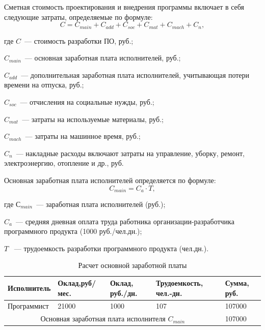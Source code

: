 Сметная стоимость проектирования и внедрения программы включает в себя следующие затраты, определяемые по формуле:
\begin{equation}
  C = C_{main} + C_{add} + C_{soc} + C_{mat} + C_{mach} + C_{n},
\end{equation}
\begin{ESKDexplanation}
  \item[где ] $C$~--- стоимость разработки ПО, руб.;
  \item $C_{main}$~--- основная заработная плата исполнителей, руб.;
  \item $C_{add}$~--- дополнительная заработная плата исполнителей, учитывающая потери времени на отпуска, руб.;
  \item $C_{soc}$~--- отчисления на социальные нужды, руб.;
  \item $C_{mat}$~--- затраты на используемые материалы, руб.;
  \item $C_{mach}$~--- затраты на  машинное время, руб.;
  \item $C_{n}$~--- накладные расходы включают затраты на управление, уборку, ремонт, электроэнергию, отопление и др., руб.
\end{ESKDexplanation}

Основная заработная плата исполнителей определяется по формуле:
\begin{equation}
  C_{main} = C_{a} \cdot T,
\end{equation}
\begin{ESKDexplanation}
  \item[где ] $С_{main}$~--- заработная плата исполнителей (руб.);
  \item $C_{a}$~--- средняя дневная оплата труда работника организации-разработчика программного продукта (1000 руб./чел.дн.);
  \item $T$ ~--- трудоемкость разработки программного продукта (чел.дн.).
\end{ESKDexplanation}

\begin{table}[H]
  \caption{Расчет основной заработной платы}
  \begin{tabular}{|p{}|p{}|p{}|p{}|p{}|}
  \hline
    Исполнитель & Оклад,\newline руб/мес. & Оклад, руб./дн. & Трудоемкость, чел.-дн. & Сумма, руб.
  \\ \hline
    Программист & 21000                   & 1000            & 107                    & 107000
  \\ \hline
    \multicolumn{4}{|c|}{Основная заработная плата исполнителя $C_{main}$}           & 107000
  \\ \hline
  \end{tabular}
\end{table}

